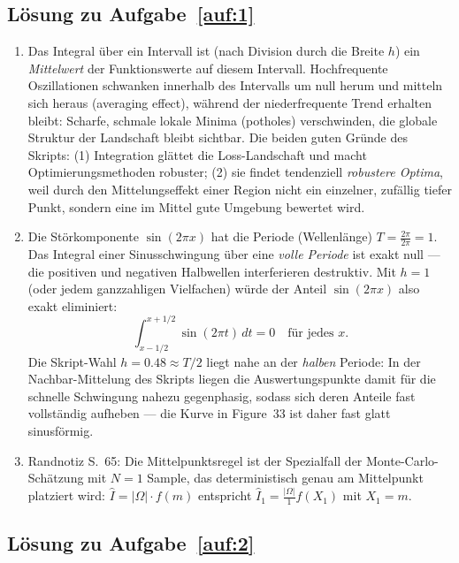 \documentclass[a4paper,11pt]{scrartcl}
\begin{document}
\subsection*{Lösung zu Aufgabe~\ref{auf:1}}

\begin{enumerate}[label=(\alph*)]
  \item Das Integral über ein Intervall ist (nach Division durch die Breite $h$) ein \emph{Mittelwert} der Funktionswerte auf diesem Intervall. Hochfrequente Oszillationen schwanken innerhalb des Intervalls um null herum und mitteln sich heraus (averaging effect), während der niederfrequente Trend erhalten bleibt: Scharfe, schmale lokale Minima (\glqq potholes\grqq) verschwinden, die globale Struktur der Landschaft bleibt sichtbar. Die beiden guten Gründe des Skripts: (1) Integration glättet die Loss-Landschaft und macht Optimierungsmethoden robuster; (2) sie findet tendenziell \emph{robustere Optima}, weil durch den Mittelungseffekt einer Region nicht ein einzelner, zufällig tiefer Punkt, sondern eine im Mittel gute Umgebung bewertet wird.
  \item Die Störkomponente $\sin(2\pi x)$ hat die Periode (Wellenlänge) $T = \frac{2\pi}{2\pi} = 1$. Das Integral einer Sinusschwingung über eine \emph{volle Periode} ist exakt null --- die positiven und negativen Halbwellen interferieren destruktiv. Mit $h = 1$ (oder jedem ganzzahligen Vielfachen) würde der Anteil $\sin(2\pi x)$ also exakt eliminiert:
  \[ \int_{x - 1/2}^{x + 1/2} \sin(2\pi t)\,dt = 0 \quad \text{für jedes } x. \]
  Die Skript-Wahl $h = 0.48 \approx T/2$ liegt nahe an der \emph{halben} Periode: In der Nachbar-Mittelung des Skripts liegen die Auswertungspunkte damit für die schnelle Schwingung nahezu gegenphasig, sodass sich deren Anteile fast vollständig aufheben --- die Kurve in Figure~33 ist daher fast glatt sinusförmig.
  \item Randnotiz S.~65: Die Mittelpunktsregel ist der Spezialfall der Monte-Carlo-Schätzung mit $N = 1$ Sample, das deterministisch genau am Mittelpunkt platziert wird: $\hat{I} = |\Omega| \cdot f(m)$ entspricht $\hat{I}_1 = \frac{|\Omega|}{1} f(X_1)$ mit $X_1 = m$.
\end{enumerate}

\subsection*{Lösung zu Aufgabe~\ref{auf:2}}
\end{document}
